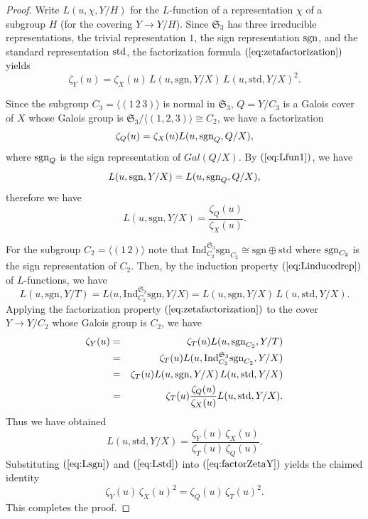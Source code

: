 \documentclass[lualatex,12pt]{article}
\begin{document}
\begin{proof}
Write $L(u,\chi,Y/H)$ for the $L$-function of a representation $\chi$ of a
subgroup $H$ (for the covering $Y\to Y/H$).  
Since ${\mathfrak S}_3$ has three  irreducible representations,
the trivial representation $1$, the sign representation ${\rm sgn}$,
and the standard representation ${\rm std}$,
the factorization formula  $(\ref{eq:zetafactorization})$ yields
\begin{equation}
 \label{eq:factorZetaY}
\zeta_Y(u)=\zeta_X(u)\,L(u,\mathrm{sgn},Y/X)\,L(u,\mathrm{std},Y/X)^2.
\end{equation}

Since the subgroup $C_3=\langle(1\,2\,3)\rangle$ is normal in ${\mathfrak S}_3$,
$Q=Y/C_3$ is a Galois cover of $X$ whose Galois group
is ${\mathfrak S}_3/\langle(1,2,3)\rangle\cong C_2$, we have a factorization
\[
 \zeta_Q(u) = \zeta_X(u)L(u, {\rm sgn}_Q, Q/X),
\]
where ${\rm sgn}_Q$ is the sign representation of $Gal(Q/X)$.
By $(\ref{eq:Lfun1})$, we have
\[
L(u, {\rm sgn}, Y/X) = L(u, {\rm sgn}_Q, Q/X),
\]
therefore we have
\begin{equation}
 \label{eq:Lsgn}
L(u,\mathrm{sgn},Y/X)=\frac{\zeta_Q(u)}{\zeta_X(u)}.
\end{equation}

For the subgroup $C_2=\langle(1\,2)\rangle$ note that
$\mathrm{Ind}_{C_2}^{{\mathfrak S}_3}\mathrm{sgn}_{C_2}\cong \mathrm{sgn}\oplus\mathrm{std}$
where ${\rm sgn}_{C_2}$ is the sign representation of $C_2$.
Then, by the induction property $(\ref{eq:Linducedrep})$
of $L$-functions, we have
\[
L(u,\mathrm{sgn},Y/T)=L\big(u,\mathrm{Ind}_{C_2}^{{\mathfrak S}_3}\mathrm{sgn},Y/X\big)
= L(u,\mathrm{sgn},Y/X)\,L(u,\mathrm{std},Y/X).
\]
Applying the factorization property $(\ref{eq:zetafactorization})$ to
the cover $Y\to Y/C_2$ whose Galois group is $C_2$, we have
\begin{eqnarray*}
 \zeta_Y(u) & = & \zeta_T(u) L(u,{\rm sgn}_{C_2}, Y/T)\\
 & = & \zeta_T(u) L(u,{\rm Ind}_{C_2}^{{\mathfrak S}_3}{\rm sgn}_{C_2}, Y/X)\\
 & =& \zeta_T(u)L(u,\mathrm{sgn},Y/X)\,L(u,\mathrm{std},Y/X)\\
 & = & \zeta_T(u)\frac{\zeta_Q(u)}{\zeta_X(u)}L(u,\mathrm{std},Y/X).
\end{eqnarray*}
Thus we have obtained
\begin{equation}
 \label{eq:Lstd}
  L(u,\mathrm{std},Y/X)
  = \frac{\zeta_Y(u)\,\zeta_X(u)}{\zeta_T(u)\,\zeta_Q(u)}.
\end{equation}
Substituting $(\ref{eq:Lsgn})$ and $(\ref{eq:Lstd})$ into
$(\ref{eq:factorZetaY})$ yields the claimed identity
\[
\zeta_Y(u)\,\zeta_X(u)^2 = \zeta_Q(u)\,\zeta_T(u)^2.
\]
This completes the proof.
\end{proof}
\end{document}
